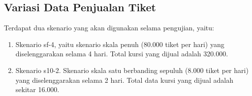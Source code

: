 \subsection{Variasi Data Penjualan Tiket}

Terdapat dua skenario yang akan digunakan selama pengujian, yaitu:

\begin{enumerate}
    \item Skenario sf-4, yaitu skenario skala penuh (80.000 tiket per hari) yang diselenggarakan selama 4 hari. Total kursi yang dijual adalah 320.000.
    \item Skenario s10-2. Skenario skala satu berbanding sepuluh (8.000 tiket per hari) yang diselenggarakan selama 2 hari. Total data kursi yang dijual adalah sekitar 16.000.
\end{enumerate}